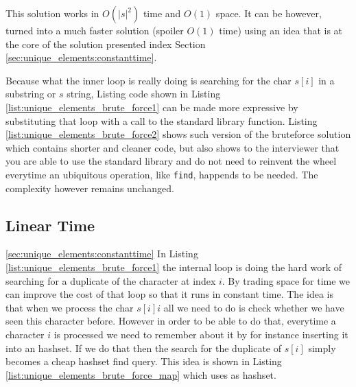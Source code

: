 This solution works in $O(|s|^2)$ time and $O(1)$ space. 
It can be however, turned into a much faster solution (spoiler $O(1)$ time) using an idea that is at the core of the solution presented index
Section \ref{sec:unique_elements:constanttime}.

\begin{minipage}{\linewidth}
	
\end{minipage}

Because what the inner loop is really doing is searching for the char $s[i]$ in a substring or $s$ string,  Listing
code shown in Listing \ref{list:unique_elements_brute_force1} can be made more expressive 
by substituting that loop with a call to the standard library  function. Listing 
\ref{list:unique_elements_brute_force2} shows such version of the bruteforce solution which contains 
shorter and cleaner code, but also shows to the interviewer that you are
able to use the standard library and do not need to 
reinvent the wheel everytime an ubiquitous operation, like \texttt{find}, happends to be needed.
The complexity however remains unchanged.
\begin{minipage}{\linewidth}
	
\end{minipage}

\subsection{Linear Time}
\ref{sec:unique_elements:constanttime}
In Listing \ref{list:unique_elements_brute_force1} the internal loop is doing the hard work of
searching for a duplicate of the character at index $i$. By trading space for time we can improve the cost of that loop so that it runs in constant time.
The idea is that when we process the char $s[i]i$ all we need to do is check whether we have seen this character before.
However in order to be able to do that, everytime a character $i$ is processed we need to remember about it by for instance inserting it 
into an hashset.
If we do that then the search for the duplicate of $s[i]$ simply becomes a cheap hashset find query.
This idea is shown in Listing \ref{list:unique_elements_brute_force_map} which uses  as hashset.
\begin{minipage}{\linewidth}
	
\end{minipage}

